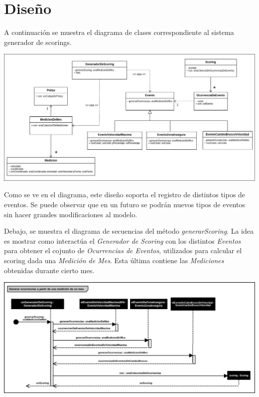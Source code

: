 \section{Diseño}

A continuación se muestra el diagrama de clases correspondiente al sistema generador 
de scorings.
\newline

\centerline{\includegraphics[width=1\textwidth]{./imagenes/clases.png}}


Como se ve en el diagrama, este diseño soporta el registro de distintos tipos de 
eventos. Se puede observar que en un futuro se podrán nuevos tipos de eventos 
sin hacer grandes modificaciones al modelo.




Debajo, se muestra el diagrama de secuencias del método \textit{generarScoring}.
La idea es mostrar como interactúa el \textit{Generador de Scoring} con los distintos
\textit{Eventos} para obtener el cojunto de \textit{Ocurrencias de Eventos}, utilizados
para calcular el scoring dada una \textit{Medición de Mes}. Esta última contiene las 
\textit{Mediciones} obtenidas durante cierto mes.
\newline

\centerline{\includegraphics[width=1\textwidth]{./imagenes/secuencias_general.png}}

